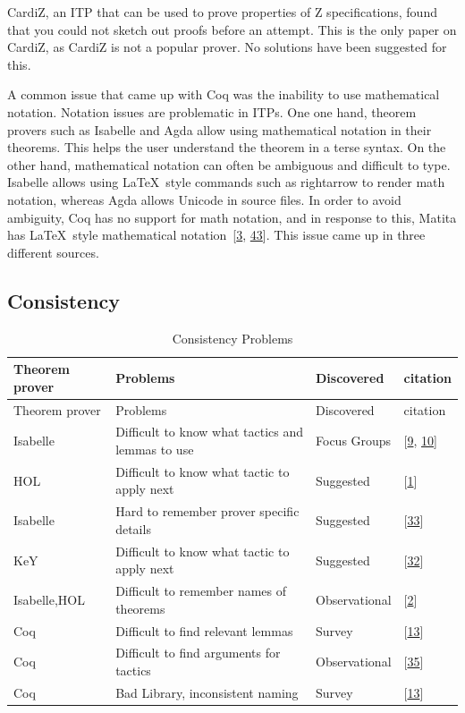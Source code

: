 \documentclass[
]{article}
\begin{document}
CardiZ, an ITP that can be used to prove properties of Z specifications,
found that you could not sketch out proofs before an attempt. This is
the only paper on CardiZ, as CardiZ is not a popular prover. No
solutions have been suggested for this.

A common issue that came up with Coq was the inability to use
mathematical notation. Notation issues are problematic in ITPs. One one
hand, theorem provers such as Isabelle and Agda allow using mathematical
notation in their theorems. This helps the user understand the theorem
in a terse syntax. On the other hand, mathematical notation can often be
ambiguous and difficult to type. Isabelle allows using LaTeX~style
commands such as rightarrow to render math notation, whereas Agda allows
Unicode in source files. In order to avoid ambiguity, Coq has no support
for math notation, and in response to this, Matita has LaTeX~style
mathematical notation~{[}\protect\hyperlink{ref-asperti_user_2007}{3},
\protect\hyperlink{ref-zacchiroli_user_2007}{43}{]}. This issue came up
in three different sources.

\hypertarget{consistency-1}{%
\subsection{Consistency}\label{consistency-1}}

\hypertarget{tbl:consistency}{}
\begin{longtable}[]{@{}llll@{}}
\caption{\label{tbl:consistency}Consistency Problems}\tabularnewline
\toprule
Theorem prover & Problems & Discovered & citation \\
\midrule
\endfirsthead
\toprule
Theorem prover & Problems & Discovered & citation \\
\midrule
\endhead
Isabelle & Difficult to know what tactics and lemmas to use & Focus
Groups & {[}\protect\hyperlink{ref-beckert_usability_2015}{9},
\protect\hyperlink{ref-beckert_interaction_2017}{10}{]} \\
HOL & Difficult to know what tactic to apply next & Suggested &
{[}\protect\hyperlink{ref-aitken_interactive_1998}{1}{]} \\
Isabelle & Hard to remember prover specific details & Suggested &
{[}\protect\hyperlink{ref-nagashima_pamper_2018}{33}{]} \\
KeY & Difficult to know what tactic to apply next & Suggested &
{[}\protect\hyperlink{ref-mitsch_keymaera_2017}{32}{]} \\
Isabelle,HOL & Difficult to remember names of theorems & Observational &
{[}\protect\hyperlink{ref-aitken_analysis_2000}{2}{]} \\
Coq & Difficult to find relevant lemmas & Survey &
{[}\protect\hyperlink{ref-berman_development_2014}{13}{]} \\
Coq & Difficult to find arguments for tactics & Observational &
{[}\protect\hyperlink{ref-ringer_replica_2020}{35}{]} \\
Coq & Bad Library, inconsistent naming & Survey &
{[}\protect\hyperlink{ref-berman_development_2014}{13}{]} \\
\bottomrule
\end{longtable}
\end{document}
